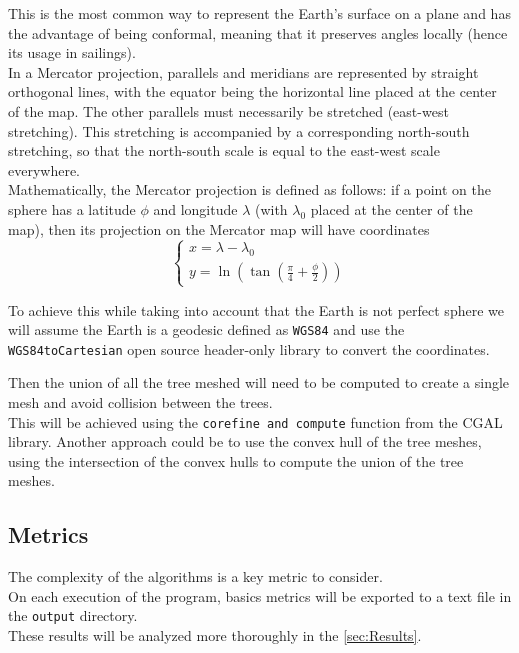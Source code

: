 \documentclass[12pt]{article}
\begin{document}
This is the most common way to represent the Earth's surface on a plane and has
the advantage of being conformal, meaning that it preserves angles locally (hence
 its usage in sailings). \\
 In a Mercator projection, parallels and meridians are represented by straight
 orthogonal lines, with the equator being the horizontal line placed at the center
  of the map. The other parallels must necessarily be stretched (east-west
  stretching). This stretching is accompanied by a corresponding north-south
  stretching, so that the north-south scale is equal to the east-west scale
  everywhere. \\
  Mathematically, the Mercator projection is defined as follows: if a point on
  the sphere has a latitude $\phi$ and longitude $\lambda$ (with $\lambda_{0}$
  placed at the center of the map), then its projection on the Mercator map will
  have coordinates
  \begin{equation}
    \left\{
    \begin{array}{l}
        x =  \lambda - \lambda_{0} \\
        y =  \ln(\tan(\frac{\pi}{4} + \frac{\phi}{2}))
    \end{array}
    \right.
\end{equation}

To achieve this while taking into account that the Earth is not perfect sphere
we will assume the Earth is a geodesic defined as \texttt{WGS84}\cite{wgs84} and use
the \texttt{WGS84toCartesian}\cite{wgs84_to_cartesian} open source header-only
library to convert the coordinates.

Then the union of all the tree meshed will need to be computed to create a single mesh
and avoid collision between the trees. \\
This will be achieved using the \texttt{corefine and compute}\cite{corefine-compute}
function from the CGAL library.
Another approach could be to use the convex hull of the tree meshes, using the
intersection of the convex hulls to compute the union of the tree meshes.

\subsection{Metrics}
The complexity of the algorithms is a key metric to consider. \\
On each execution of the program, basics metrics will be exported to a text file in
the \texttt{output} directory. \\
These results will be analyzed more thoroughly in the \autoref{sec:Results}.
\end{document}
